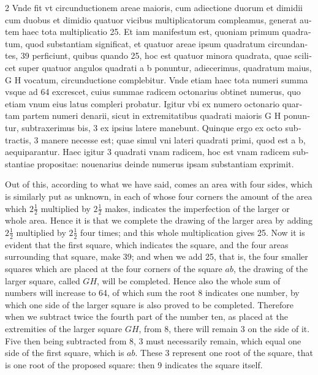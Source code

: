 \documentclass[11pt,a4paper,twoside]{book}
\newcommand{\latincolumn}[1]{\textlatin{\small #1}}
\begin{document}
\begin{paracol}{2}
\latincolumn{Vnde fit vt circunductionem areae maioris, cum adiectione duorum et dimidii cum duobus et dimidio quatuor vicibus multiplicatorum compleamus, generat autem haec tota multiplicatio 25. Et iam manifestum est, quoniam primum quadratum, quod substantiam significat, et quatuor areae ipsum quadratum circundantes, 39 perficiunt, quibus quando 25, hoc est quatuor minora quadrata, quae scilicet super quatuor angulos quadrati a b ponuntur, adiecerimus, quadratum maius, G H vocatum, circunductione complebitur. Vnde etiam haec tota numeri summa vsque ad 64 excrescet, cuius summae radicem octonarius obtinet numerus, quo etiam vnum eius latus compleri probatur. Igitur vbi ex numero octonario quartam partem numeri denarii, sicut in extremitatibus quadrati maioris G H ponuntur, subtraxerimus bis, 3 ex ipsius latere manebunt. Quinque ergo ex octo subtractis, 3 manere necesse est; quae simul vni lateri quadrati primi, quod est a b, aequiparantur. Haec igitur 3 quadrati vnam radicem, hoc est vnam radicem substantiae propositae: nouenarius deinde numerus ipsam substantiam exprimit.}

\switchcolumn

Out of this, according to what we have said, comes an area with four sides, which is similarly put as unknown, in each of whose four corners the amount of the area which $2\frac{1}{2}$ multiplied by $2\frac{1}{2}$ makes, indicates the imperfection of the larger or whole area. Hence it is that we complete the drawing of the larger area by adding $2\frac{1}{2}$ multiplied by $2\frac{1}{2}$ four times; and this whole multiplication gives 25. Now it is evident that the first square, which indicates the square, and the four areas surrounding that square, make 39; and when we add 25, that is, the four smaller squares which are placed at the four corners of the square $ab$, the drawing of the larger square, called $GH$, will be completed. Hence also the whole sum of numbers will increase to 64, of which sum the root 8 indicates one number, by which one side of the larger square is also proved to be completed. Therefore when we subtract twice the fourth part of the number ten, as placed at the extremities of the larger square $GH$, from 8, there will remain 3 on the side of it. Five then being subtracted from 8, 3 must necessarily remain, which equal one side of the first square, which is $ab$. These 3 represent one root of the square, that is one root of the proposed square: then 9 indicates the square itself.

\switchcolumn*


\end{paracol}
\end{document}
